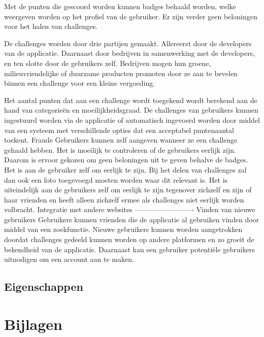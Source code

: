 \documentclass[11pt,fleqn,oneside,openany]{book} %
\begin{document}
Met de punten die gescoord worden kunnen badges behaald worden, welke weergeven worden op het profiel van de gebruiker. Er zijn verder geen beloningen voor het halen van challenges.

De challenges worden door drie partijen gemaakt. Allereerst door de developers van de applicatie. Daarnaast door bedrijven in samenwerking met de developers, en ten slotte door de gebruikers zelf. Bedrijven mogen hun groene, milieuvriendelijke of duurzame producten promoten door ze aan te bevelen binnen een challenge voor een kleine vergoeding.

Het aantal punten dat aan een challenge wordt toegekend wordt berekend aan de hand van categorieën en moeilijkheidsgraad. De challenges van gebruikers kunnen ingestuurd worden via de applicatie of automatisch ingevoerd worden door middel van een systeem met verschillende opties dat een acceptabel puntenaantal toekent.
Fraude
Gebruikers kunnen zelf aangeven wanneer ze een challenge gehaald hebben. Het is moeilijk te controleren of de gebruikers eerlijk zijn. Daarom is ervoor gekozen om geen beloningen uit te geven behalve de badges. Het is aan de gebruiker zelf om eerlijk te zijn. Bij het delen van challenges zal dan ook een foto toegevoegd moeten worden waar dit relevant is.
Het is uiteindelijk aan de gebruikers zelf om eerlijk te zijn tegenover zichzelf en zijn of haar vrienden en heeft alleen zichzelf ermee als challenges niet eerlijk worden volbracht.
Integratie met andere websites
-------------------------
Vinden van nieuwe gebruikers
Gebruikers kunnen vrienden die de applicatie al gebruiken vinden door middel van een zoekfunctie. Nieuwe gebruikers kunnen worden aangetrokken doordat challenges gedeeld kunnen worden op andere platformen en zo groeit de bekendheid van de applicatie. Daarnaast kan een gebruiker potentiële gebruikers uitnodigen om een account aan te maken.


\section{Eigenschappen}


\chapter*{Bijlagen}
\end{document}
